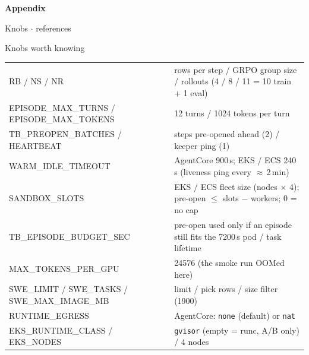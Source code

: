 \appendix
{}
{
\begin{frame}[plain]
\vfill
{\fontsize{26}{30}\selectfont\bfseries\color{white}Appendix\par}
\par\vspace{3mm}
{\small\color{white}Knobs $\cdot$ references\par}
\vfill
\end{frame}}

\begin{frame}{Knobs worth knowing}
\scriptsize
\begin{tabularx}{\textwidth}{@{}>{\ttfamily}p{4.6cm}X@{}}
\toprule
RB / NS / NR & rows per step / GRPO group size / rollouts (4 / 8 / 11 = 10 train + 1 eval)\\
EPISODE\_MAX\_TURNS / EPISODE\_MAX\_TOKENS & 12 turns / 1024 tokens per turn\\
TB\_PREOPEN\_BATCHES / HEARTBEAT & steps pre-opened ahead (2) / keeper ping (1)\\
WARM\_IDLE\_TIMEOUT & AgentCore 900\,s; EKS / ECS 240\,s (liveness ping every $\approx$\,2\,min)\\
SANDBOX\_SLOTS & EKS / ECS fleet size (nodes $\times$ 4); pre-open $\le$ slots $-$ workers; 0 = no cap\\
TB\_EPISODE\_BUDGET\_SEC & pre-open used only if an episode still fits the 7200\,s pod / task lifetime\\
MAX\_TOKENS\_PER\_GPU & 24576 (the smoke run OOMed here)\\
SWE\_LIMIT / SWE\_TASKS / SWE\_MAX\_IMAGE\_MB & limit / pick rows / size filter (1900)\\
RUNTIME\_EGRESS & AgentCore: \texttt{none} (default) or \texttt{nat}\\
EKS\_RUNTIME\_CLASS / EKS\_NODES & \texttt{gvisor} (empty = runc, A/B only) / 4 nodes\\
\bottomrule
\end{tabularx}
\end{frame}

